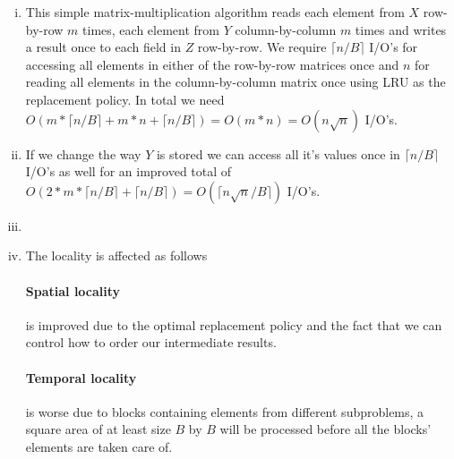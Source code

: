 \begin{enumerate}[(i)]
	\item
This simple matrix-multiplication algorithm reads each element from $X$ row-by-row $m$ times, each element from $Y$ column-by-column $m$ times and writes a result once to each field in $Z$ row-by-row. We require $\lceil n/B \rceil$ I/O's for accessing all elements in either of the row-by-row matrices once and $n$ for reading all elements in the column-by-column matrix once using \textsc{LRU} as the replacement policy. In total we need $O(m * \lceil n/B \rceil + m * n + \lceil n/B \rceil) = O(m * n) = O(n\sqrt{n})$ I/O's.
	\item
If we change the way $Y$ is stored we can access all it's values once in $\lceil n/B \rceil$ I/O's as well for an improved total of $O(2 * m * \lceil n/B \rceil +  \lceil n/B \rceil) = O(\lceil n\sqrt{n}/B \rceil)$ I/O's.
	\item

	\item The locality is affected as follows
\paragraph{Spatial locality} is improved due to the optimal replacement policy and the fact that we can control how to order our intermediate results.
\paragraph{Temporal locality} is worse due to blocks containing elements from different subproblems, a square area of at least size $B$ by $B$ will be processed before all the blocks' elements are taken care of.
\end{enumerate}
